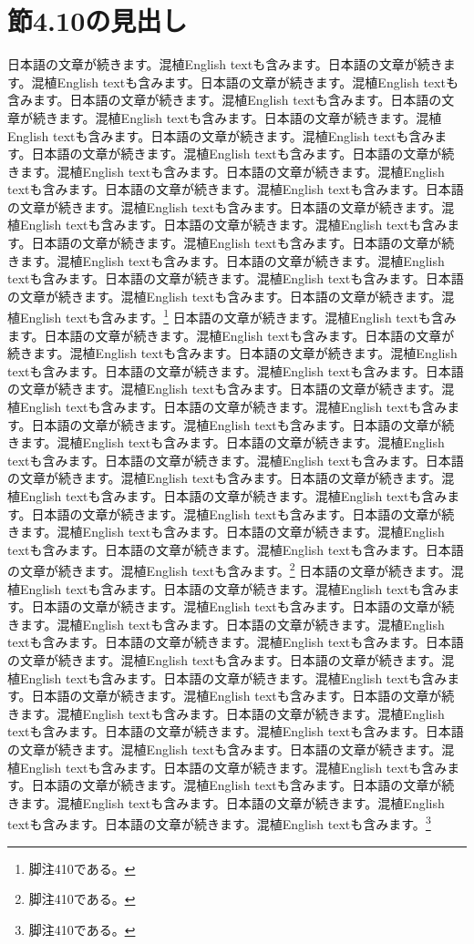 \documentclass[pdflatex,book]{jlreq}
\begin{document}
\section{節4.10の見出し}
日本語の文章が続きます。混植English textも含みます。日本語の文章が続きます。混植English textも含みます。日本語の文章が続きます。混植English textも含みます。日本語の文章が続きます。混植English textも含みます。日本語の文章が続きます。混植English textも含みます。日本語の文章が続きます。混植English textも含みます。日本語の文章が続きます。混植English textも含みます。日本語の文章が続きます。混植English textも含みます。日本語の文章が続きます。混植English textも含みます。日本語の文章が続きます。混植English textも含みます。日本語の文章が続きます。混植English textも含みます。日本語の文章が続きます。混植English textも含みます。日本語の文章が続きます。混植English textも含みます。日本語の文章が続きます。混植English textも含みます。日本語の文章が続きます。混植English textも含みます。日本語の文章が続きます。混植English textも含みます。日本語の文章が続きます。混植English textも含みます。日本語の文章が続きます。混植English textも含みます。日本語の文章が続きます。混植English textも含みます。日本語の文章が続きます。混植English textも含みます。\footnote{脚注410である。}
日本語の文章が続きます。混植English textも含みます。日本語の文章が続きます。混植English textも含みます。日本語の文章が続きます。混植English textも含みます。日本語の文章が続きます。混植English textも含みます。日本語の文章が続きます。混植English textも含みます。日本語の文章が続きます。混植English textも含みます。日本語の文章が続きます。混植English textも含みます。日本語の文章が続きます。混植English textも含みます。日本語の文章が続きます。混植English textも含みます。日本語の文章が続きます。混植English textも含みます。日本語の文章が続きます。混植English textも含みます。日本語の文章が続きます。混植English textも含みます。日本語の文章が続きます。混植English textも含みます。日本語の文章が続きます。混植English textも含みます。日本語の文章が続きます。混植English textも含みます。日本語の文章が続きます。混植English textも含みます。日本語の文章が続きます。混植English textも含みます。日本語の文章が続きます。混植English textも含みます。日本語の文章が続きます。混植English textも含みます。日本語の文章が続きます。混植English textも含みます。\footnote{脚注410である。}
日本語の文章が続きます。混植English textも含みます。日本語の文章が続きます。混植English textも含みます。日本語の文章が続きます。混植English textも含みます。日本語の文章が続きます。混植English textも含みます。日本語の文章が続きます。混植English textも含みます。日本語の文章が続きます。混植English textも含みます。日本語の文章が続きます。混植English textも含みます。日本語の文章が続きます。混植English textも含みます。日本語の文章が続きます。混植English textも含みます。日本語の文章が続きます。混植English textも含みます。日本語の文章が続きます。混植English textも含みます。日本語の文章が続きます。混植English textも含みます。日本語の文章が続きます。混植English textも含みます。日本語の文章が続きます。混植English textも含みます。日本語の文章が続きます。混植English textも含みます。日本語の文章が続きます。混植English textも含みます。日本語の文章が続きます。混植English textも含みます。日本語の文章が続きます。混植English textも含みます。日本語の文章が続きます。混植English textも含みます。日本語の文章が続きます。混植English textも含みます。\footnote{脚注410である。}
\end{document}
